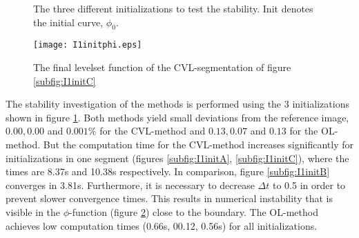 \begin{figure}[h]
  \centering
  \caption{The three different initializations to test the stability. Init denotes the initial curve, $\phi_0$.}\label{I1init}
\end{figure}

\begin{figure}[h]
  \centering
  \texttt{[image: I1initphi.eps]}
  \caption{The final levelset function of the CVL-segmentation of figure \ref{subfig:I1initC}}\label{I1initphi}
\end{figure}


The stability investigation of the methods is performed using the 3 initializations shown in figure \ref{I1init}. Both methods yield small deviations from the reference image, $0.00, 0.00$ and $0.001\%$ for the CVL-method and $0.13, 0.07$ and $0.13$ for the OL-method. But the computation time for the CVL-method increases significantly for initializations in one segment (figures \ref{subfig:I1initA}, \ref{subfig:I1initC}), where the times are 8.37s and 10.38s respectively. In comparison, figure \ref{subfig:I1initB} converges in 3.81s. Furthermore, it is necessary to decrease $\Delta t$ to 0.5 in order to prevent slower convergence times. This results in numerical instability that is visible in the $\phi$-function (figure \ref{I1initphi}) close to the boundary. The OL-method achieves low computation times (0.66s, 00.12, 0.56s) for all initializations.


